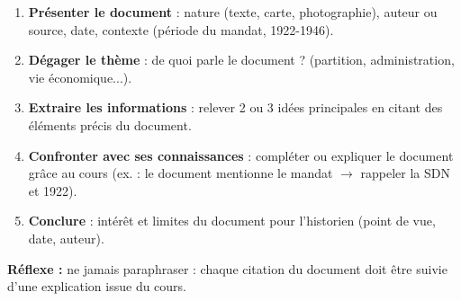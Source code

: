 \documentclass[11pt]{article}
\begin{document}
\begin{methode}
\begin{enumerate}
\item \textbf{Présenter le document} : nature (texte, carte, photographie), auteur ou source, date, contexte (période du mandat, 1922-1946).
\item \textbf{Dégager le thème} : de quoi parle le document ? (partition, administration, vie économique...).
\item \textbf{Extraire les informations} : relever 2 ou 3 idées principales en citant des éléments précis du document.
\item \textbf{Confronter avec ses connaissances} : compléter ou expliquer le document grâce au cours (ex. : le document mentionne le mandat $\rightarrow$ rappeler la SDN et 1922).
\item \textbf{Conclure} : intérêt et limites du document pour l'historien (point de vue, date, auteur).
\end{enumerate}
\textbf{Réflexe :} ne jamais paraphraser : chaque citation du document doit être suivie d'une explication issue du cours.
\end{methode}
\end{document}
